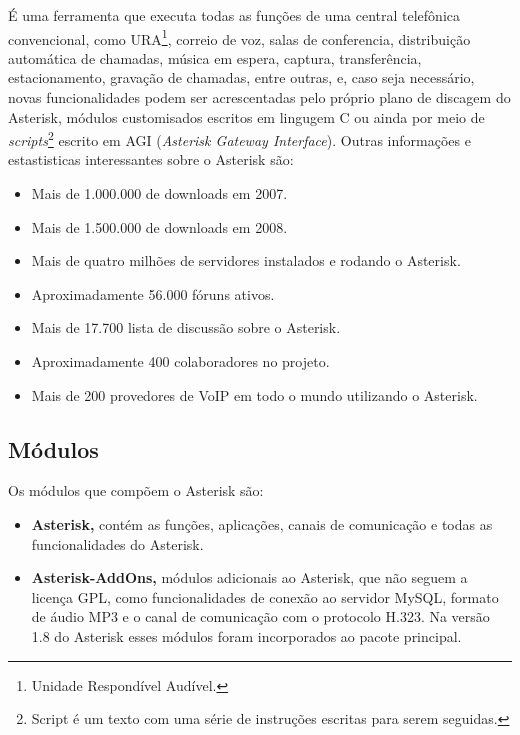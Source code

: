 É uma ferramenta que executa todas as funções de uma central telefônica convencional, como URA\footnote{Unidade Respondível Audível.}, correio de voz, salas de conferencia, distribuição automática de chamadas, música em espera, captura, transferência, estacionamento, gravação de chamadas, entre outras, e, caso seja necessário, novas funcionalidades podem ser acrescentadas pelo próprio plano de discagem do Asterisk, módulos customisados escritos em lingugem C ou ainda por meio de \textit{scripts}\footnote{Script é um texto com uma série de instruções escritas para serem seguidas.} escrito em AGI (\textit{Asterisk Gateway Interface}). Outras informações e estastisticas interessantes sobre o Asterisk são: \cite{alexandrekeller2014}

\begin{itemize}
  \item Mais de 1.000.000 de downloads em 2007.
  \item Mais de 1.500.000 de downloads em 2008.
  \item Mais de quatro milhões de servidores instalados e rodando o Asterisk.
  \item Aproximadamente 56.000 fóruns ativos.
  \item Mais de 17.700 lista de discussão sobre o Asterisk.
  \item Aproximadamente 400 colaboradores no projeto.
  \item Mais de 200 provedores de VoIP em todo o mundo utilizando o Asterisk.
\end{itemize}

\subsection{Módulos}
Os módulos que compõem o Asterisk são: \cite{books/daglib/0018909}

\begin{itemize}
  \item \textbf{Asterisk,} contém as funções, aplicações, canais de comunicação e todas as funcionalidades do Asterisk.
  \item \textbf{Asterisk-AddOns,} módulos adicionais ao Asterisk, que não seguem a licença GPL, como funcionalidades de conexão ao servidor MySQL, formato de áudio MP3 e o canal de comunicação com o protocolo H.323. Na versão 1.8 do Asterisk esses módulos foram incorporados ao pacote principal.
\end{itemize}





















